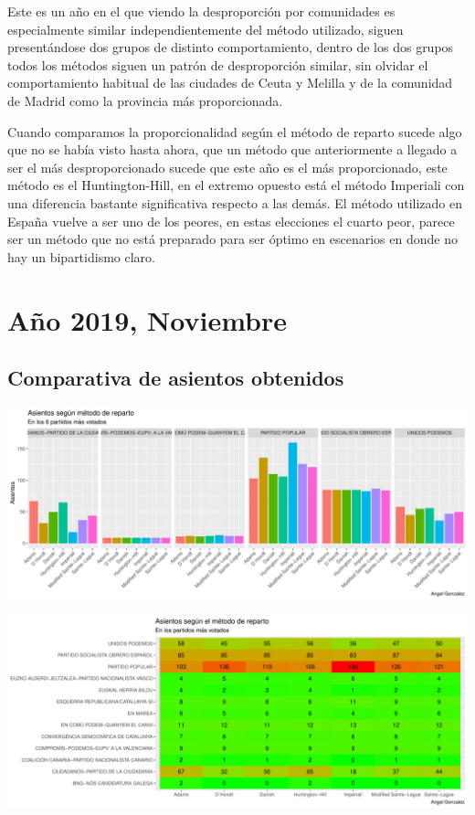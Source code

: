\documentclass[12pt,a4paper,]{book}
\numberwithin{dummy}{section}
\theoremstyle{ocrenumbox}
\theoremstyle{blacknumex}
\theoremstyle{blacknumbox}
\theoremstyle{ocrenum}
\theoremstyle{ocrenum}
\begin{document}
Este es un año en el que viendo la desproporción por comunidades es
especialmente similar independientemente del método utilizado, siguen
presentándose dos grupos de distinto comportamiento, dentro de los dos
grupos todos los métodos siguen un patrón de desproporción similar, sin
olvidar el comportamiento habitual de las ciudades de Ceuta y Melilla y
de la comunidad de Madrid como la provincia más proporcionada.

Cuando comparamos la proporcionalidad según el método de reparto sucede
algo que no se había visto hasta ahora, que un método que anteriormente
a llegado a ser el más desproporcionado sucede que este año es el más
proporcionado, este método es el Huntington-Hill, en el extremo opuesto
está el método Imperiali con una diferencia bastante significativa
respecto a las demás. El método utilizado en España vuelve a ser uno de
los peores, en estas elecciones el cuarto peor, parece ser un método que
no está preparado para ser óptimo en escenarios en donde no hay un
bipartidismo claro.

\hypertarget{auxf1o-2019-noviembre}{%
\section{Año 2019, Noviembre}\label{auxf1o-2019-noviembre}}

\hypertarget{comparativa-de-asientos-obtenidos-14}{%
\subsection{Comparativa de asientos
obtenidos}\label{comparativa-de-asientos-obtenidos-14}}

\begin{center}\includegraphics[width=1\linewidth]{figurasR/unnamed-chunk-118-1} \end{center}

\begin{center}\includegraphics[width=1\linewidth]{figurasR/unnamed-chunk-118-2} \end{center}
\end{document}
